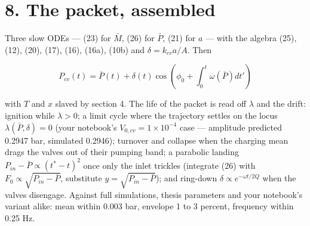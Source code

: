 \documentclass[11pt]{article}
\begin{document}
\section*{8. The packet, assembled}

Three slow ODEs --- (23) for $\bar M$, (26) for $\bar P$, (21) for $a$ --- with the algebra (25), (12), (20), (17), (16), (16a), (10b) and $\delta = k_{cv}a/A$. Then

\begin{equation}
P_{cv}(t) = \bar P(t) + \delta(t)\cos\left(\phi_0 + \int_0^t\omega(\bar P)dt'\right) \tag{27}
\end{equation}

with $T$ and $x$ slaved by section 4. The life of the packet is read off $\lambda$ and the drift: ignition while $\lambda > 0$; a limit cycle where the trajectory settles on the locus $\lambda(\bar P, \delta) = 0$ (your notebook's $V_{0,cv} = 1\times10^{-4}$ case --- amplitude predicted 0.2947 bar, simulated 0.2946); turnover and collapse when the charging mean drags the valves out of their pumping band; a parabolic landing $P_{in} - \bar P \propto (t^\ast - t)^2$ once only the inlet trickles (integrate (26) with $F_0 \propto \sqrt{P_{in}-\bar P}$, substitute $y = \sqrt{P_{in}-\bar P}$); and ring-down $\delta \propto e^{-\omega t/2Q}$ when the valves disengage. Against full simulations, thesis parameters and your notebook's variant alike: mean within 0.003 bar, envelope 1 to 3 percent, frequency within 0.25 Hz.
\end{document}

